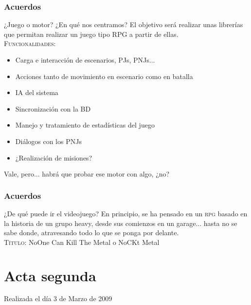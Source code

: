 \documentclass[9pt,xcolor=svgnames]{beamer}
\begin{document}
 \begin{frame}
  \frametitle{Acuerdos}
  \transdissolve
  
  \begin{block}{¿Juego o motor? ¿En qué nos centramos?}
   El objetivo será realizar unas librerías que permitan realizar un
   juego tipo RPG a partir de ellas.\\

   \textsc{Funcionalidades}:
   \begin{itemize}
    \item Carga e interacción de escenarios, PJs, PNJs...
    \item Acciones tanto de movimiento en escenario como en batalla
    \item IA del sistema
    \item Sincronización con la BD
    \item Manejo y tratamiento de estadísticas del juego
    \item Diálogos con los PNJs
    \item ¿Realización de misiones?
   \end{itemize}
  \end{block}

  Vale, pero... habrá que probar ese motor con algo, ¿no?
 \end{frame}


 \begin{frame}
  \frametitle{Acuerdos}
  \transdissolve
  
  \begin{block}{¿De qué puede ir el videojuego?}
   En principio, se ha pensado en un \textsc{rpg} basado en la historia
   de un grupo heavy, desde sus comienzos en un garage... hasta no se
   sabe donde, atravesando todo lo que se ponga por delante.\\[1cm]

   \Large{\textsc{Título:} NoOne Can Kill The Metal o NoCKt Metal}
  \end{block}


 \end{frame}
   
 
 \section{Acta segunda}

 Realizada el día 3 de Marzo de 2009
\end{document}
